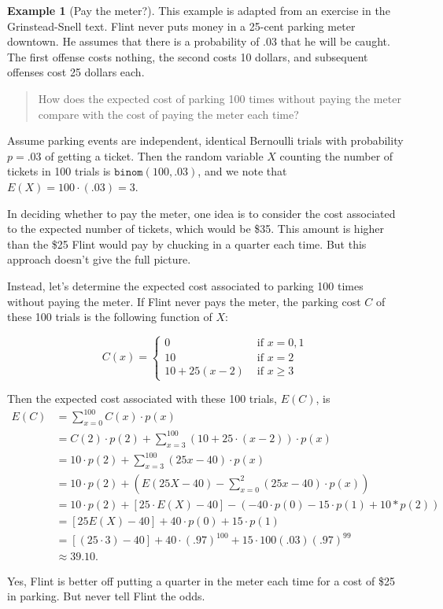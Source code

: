 \documentclass[
]{book}
\theoremstyle{definition}
\theoremstyle{definition}
\newtheorem{example}{Example}[chapter]
\theoremstyle{definition}
\theoremstyle{definition}
\theoremstyle{remark}
\begin{document}
\begin{example}[Pay the meter?]
\protect\hypertarget{exm:parking-meter}{}\label{exm:parking-meter}This example is adapted from an exercise in the Grinstead-Snell text. Flint never puts money in a 25-cent parking meter downtown. He assumes that there is a probability of .03 that he will be caught. The first offense costs nothing, the second costs 10 dollars, and subsequent offenses cost 25 dollars each.

\begin{quote}
How does the expected cost of parking 100 times without paying the meter compare with the cost of paying the meter each time?
\end{quote}

Assume parking events are independent, identical Bernoulli trials with probability \(p = .03\) of getting a ticket. Then the random variable \(X\) counting the number of tickets in 100 trials is \(\texttt{binom}(100,.03)\), and we note that \(E(X) = 100\cdot(.03) = 3\).

In deciding whether to pay the meter, one idea is to consider the cost associated to the expected number of tickets, which would be \$35. This amount is higher than the \$25 Flint would pay by chucking in a quarter each time. But this approach doesn't give the full picture.

Instead, let's determine the expected cost associated to parking 100 times without paying the meter. If Flint never pays the meter, the parking cost \(C\) of these 100 trials is the following function of \(X\):

\[
C(x)=
\begin{cases}
0 &\text{ if }x = 0,1 \\
10  &\text{ if } x = 2 \\
10+25(x-2) &\text{ if } x \geq 3 
\end{cases}
\]

Then the expected cost associated with these 100 trials, \(E(C)\), is
\begin{align*}
E(C) &= \sum_{x=0}^{100} C(x)\cdot p(x)\\
    &= C(2)\cdot p(2) + \sum_{x=3}^{100} (10 + 25\cdot(x-2))\cdot p(x) \\
    &= 10\cdot p(2) + \sum_{x=3}^{100} (25x - 40)\cdot p(x) \\
    &= 10\cdot p(2)  + \left(E(25X-40) - \sum_{x=0}^{2} (25x - 40)\cdot p(x)\right)\\
    &= 10\cdot p(2) + [25\cdot E(X) - 40] - \left(-40\cdot p(0) -15 \cdot p(1)+ 10*p(2)\right)\\
    &= [25 E(X) - 40] + 40 \cdot p(0) + 15 \cdot p(1) \\
    &= [(25 \cdot 3) - 40] + 40\cdot(.97)^{100} + 15\cdot 100(.03)(.97)^{99} \\
    &\approx 39.10.
\end{align*}

Yes, Flint is better off putting a quarter in the meter each time for a cost of \$25 in parking. But never tell Flint the odds.
\end{example}
\end{document}

